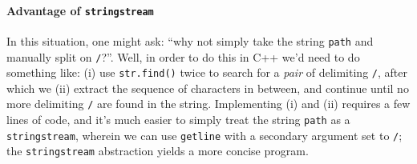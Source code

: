 \documentclass[12pt,letterpaper,twoside]{article}
\begin{document}
\paragraph{Advantage of \texttt{stringstream}} In this situation, one might ask:
``why not simply take the string \texttt{path} and manually split on \texttt{/}?''.
Well, in order to do this in C++ we'd need to do something like: (i)
use \texttt{str.find()} twice to search for a \emph{pair} of delimiting \texttt{/},
after which we (ii) extract the sequence of characters in between, and continue until
no more delimiting \texttt{/} are found in the string. Implementing (i) and (ii) 
requires a few lines of code, and it's much easier to simply treat the string 
\texttt{path} as a \texttt{stringstream}, wherein we can use \texttt{getline} with a 
secondary argument set to \texttt{/}; the \texttt{stringstream} 
abstraction yields a more concise program.




\end{document}
